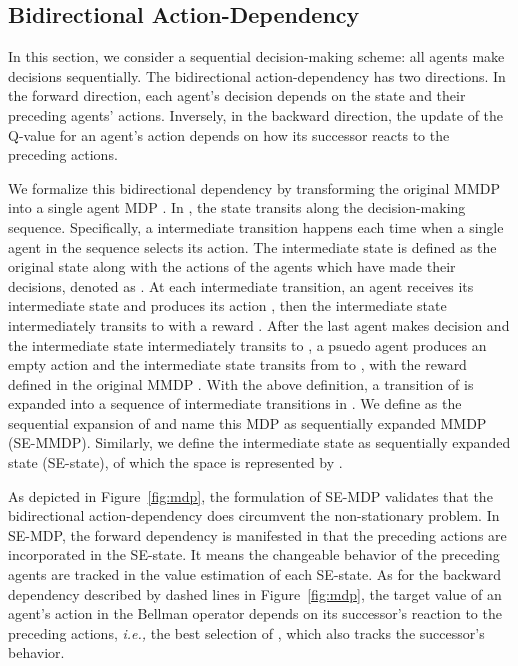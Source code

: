 \documentclass[letterpaper]{article} \usepackage{aaai23}  \usepackage{times}  \usepackage{helvet}  \usepackage{courier}  \usepackage[hyphens]{url}  \usepackage{graphicx} \urlstyle{rm} \def\UrlFont{\rm}  \usepackage{natbib}  \usepackage{caption} \frenchspacing  \setlength{\pdfpagewidth}{8.5in} \setlength{\pdfpageheight}{11in} \usepackage{algorithm}
\begin{document}
\subsection{Bidirectional Action-Dependency}
\vspace{-0.5ex}
In this section, we consider a sequential decision-making scheme: all agents make decisions sequentially. The bidirectional action-dependency has two directions. In the forward direction, each agent's decision depends on the state and their preceding agents' actions. Inversely, in the backward direction, the update of the Q-value for an agent's action depends on how its successor reacts to the preceding actions. 

We formalize this bidirectional dependency by transforming the original MMDP  into a single agent MDP . In , the state transits along the decision-making sequence. Specifically, a intermediate transition happens each time when a single agent in the sequence selects its action. The intermediate state is defined as the original state  along with the actions of the agents which have made their decisions, denoted as . At each intermediate transition, an agent  receives its intermediate state  and produces its action , then the intermediate state intermediately transits to  with a reward . After the last agent  makes decision and the intermediate state intermediately transits to , a psuedo agent produces an empty action  and the intermediate state transits from  to , with the reward  defined in the original MMDP . With the above definition, a transition  of  is expanded into a sequence of intermediate transitions    in . We define  as the sequential expansion of  and name this MDP as sequentially expanded MMDP (SE-MMDP). Similarly, we define the intermediate state  as sequentially expanded state (SE-state), of which the space is represented by .

As depicted in Figure~\ref{fig:mdp}, the formulation of SE-MDP validates that the bidirectional action-dependency does circumvent the non-stationary problem. In SE-MDP, the forward dependency is manifested in that the preceding actions are incorporated in the SE-state. It means the changeable behavior of the preceding agents are tracked in the value estimation of each SE-state. As for the backward dependency described by dashed lines in Figure~\ref{fig:mdp}, the target value of an agent's action  in the Bellman operator depends on its successor's reaction to the preceding actions, \textit{i.e.,} the best selection of , which also tracks the successor's behavior.
\end{document}
